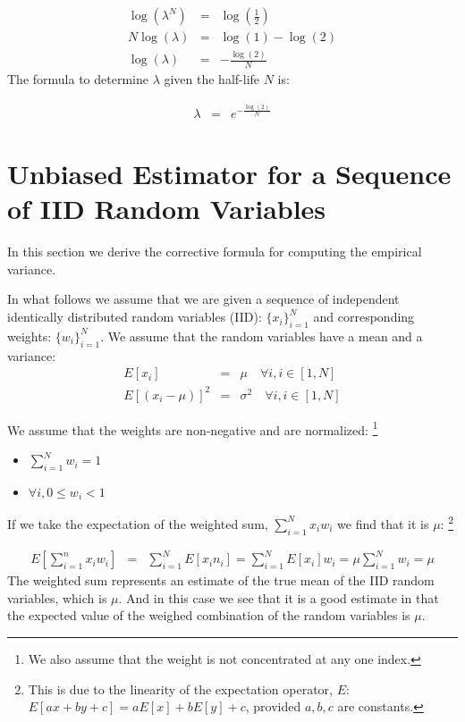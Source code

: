 \documentclass{article}
\begin{document}
\begin{eqnarray*}
    \log(\lambda^N) &=&  \log(\frac{1}{2}) \\
    N \log(\lambda) &=& \log(1) - \log(2)  \\
    \log(\lambda)   &=& -\frac{\log(2)}{N} 
\end{eqnarray*}
The formula to determine $\lambda$ given the half-life $N$ is:

\begin{eqnarray}
    \lambda &=& e^{-\frac{\log(2)}{N}}
\end{eqnarray}

\appendix

\section{Unbiased Estimator for a Sequence of IID Random Variables}
In this section we derive the corrective formula for computing the empirical variance.

In what follows we assume that we are given a sequence of independent identically distributed random variables (IID):
$\{x_i\}_{i=1}^N$ and corresponding weights: $\{w_i\}_{i=1}^N$.
We assume that the random variables have a mean and a variance:
\begin{eqnarray}
    E[x_i] &=& \mu  \quad \forall i, i \in [1, N] \\
    E[(x_i - \mu)]^2 &=& \sigma^2 \quad \forall i, i \in [1, N]  
\end{eqnarray}

We assume that the weights are non-negative and are normalized:%
\footnote{We also assume that the weight is not concentrated at any
one index.}
\begin{itemize}
    \item{$\sum_{i=1}^N w_i = 1$}
    \item{$\forall i, 0 \le w_i < 1$}
\end{itemize}

If we take the expectation of the weighted sum, $\sum_{i=1}^N x_i w_i$ we find that it is $\mu$:%
\footnote{This is due to the linearity of the expectation operator, $E$:
$E[a x + b y + c] = a E[x] + b E[y] + c$, provided $a,b,c$ are constants.}

\begin{eqnarray}
    E\left[\sum_{i=1}^n x_i w_i\right] &=& \sum_{i=1}^N E[x_i n_i ] = \sum_{i=1}^N E[x_i] w_i = \mu \sum_{i=1}^N w_i = \mu 
\end{eqnarray}
The weighted sum represents an estimate of the true mean of the IID random variables, which is $\mu$.
And in this case we see that it is a good estimate in that the expected value of the weighed combination
of the random variables is $\mu$. 
\end{document}
